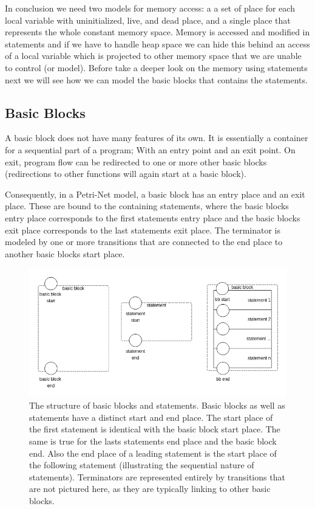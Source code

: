 In conclusion we need two models for memory access: a a set of place for each local variable with uninitialized, live, and dead place, and a single place that represents the whole constant memory space.
Memory is accessed and modified in statements and if we have to handle heap space we can hide this behind an access of a local variable which is projected to other memory space that we are unable to control (or model).
Before take a deeper look on the memory using statements next we will see how we can model the basic blocks that contains the statements.

\subsection{Basic Blocks}
A basic block does not have many features of its own.
It is essentially a container for a sequential part of a program; 
With an entry point and an exit point.
On exit, program flow can be redirected to one or more other basic blocks (redirections to other functions will again  start at a basic block).

Consequently, in a Petri-Net model, a basic block has an entry place and an exit place.
These are bound to the containing statements, where the basic blocks entry place corresponds to the first statements entry place and the basic blocks exit place corresponds to the last statements exit place.
The terminator is modeled by one or more transitions that are connected to the end place to another basic blocks start place.

\begin{figure}
    \centering
    \includegraphics[width=.9\textwidth]{../diagrams/basic_blocks.png}
    \caption{
        The structure of basic blocks and statements.
        Basic blocks as well as statements have a distinct start and end place.
        The start place of the first statement is identical with the basic block start place.
        The same is true for the lasts statements end place and the basic block end.
        Also the end place of a leading statement is the start place of the following statement (illustrating the sequential nature of statements).
        Terminators are represented entirely by transitions that are not pictured here, as they are typically linking to other basic blocks.
    }
    \label{basic_block_trans}
\end{figure}

